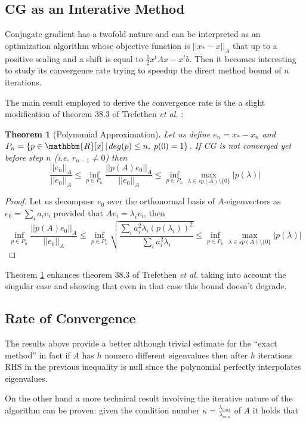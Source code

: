 \documentclass[12pt]{article}
\newcommand{\R}{\mathbbm{R}}
\newcommand{\1}{\mathbbm{1}}
\newtheorem{theorem}{Theorem}
\begin{document}
\subsection{CG as an Interative Method}
Conjugate gradient has a twofold nature and can be interpreted as an optimization algorithm whose objective function is $ || x_* - x ||_A $ that up to a positive scaling and a shift is equal to $ \frac{1}{2}x^t A x - x^t b$. Then it becomes interesting to study its convergence rate trying to speedup the direct method bound of $n$ iterations.

The main result employed to derive the convergence rate is the a slight modification of theorem 38.3 of Trefethen {\em et al.} \cite{trefethen97}:

\begin{theorem}[Polynomial Approximation]\label{polap}
  Let us define $e_n = x_* - x_n$ and $P_n = \left\{p \in \R[x]\, |\, deg(p) \leq n, \; p(0) = 1 \right\}$. If CG is not converged yet before step $n$ (i.e. $r_{n-1} \neq 0$) then 
$$ \frac{||e_n||_A}{||e_0||_A} \leq \inf_{p \in P_n}\frac{||p(A) e_0||_A}{||e_0||_A} \leq \inf_{p \in P_n} \max_{\lambda \in sp(A)\setminus\{0\}}|p(\lambda)|
$$
\end{theorem}
\begin{proof}
  Let us decompose $e_0$ over the orthonormal basis of $A$-eigenvectors as\\ $e_0 = \sum_i a_i v_i$ provided that $A v_i = \lambda_i v_i$, then
$$\inf_{p \in P_n}\frac{||p(A) e_0||_A}{||e_0||_A} \leq \inf_{p \in P_n}\sqrt{\frac{\sum_i a_i^2 \lambda_i \left(p(\lambda_i)\right)^2}{\sum_i a_i^2 \lambda_i}}\leq \inf_{p \in P_n} \max_{\lambda \in sp(A)\setminus\{0\}}|p(\lambda)|$$

\end{proof}

 Theorem \ref{polap} enhances theorem 38.3 of Trefethen {\em et al.} \cite{trefethen97} taking into account the singular case and showing that even in that case this bound doesn't degrade.

\subsection{Rate of Convergence}
The results above provide a better although trivial estimate for the ``exact method'' in fact if $A$ has $h$ nonzero different eigenvalues then after $h$ iterations RHS in the previous inequality is null since the polynomial perfectly interpolates eigenvalues.

On the other hand a more technical result involving the iterative nature of the algorithm can be proven: given the condition number $\kappa = \frac{\lambda_{max}}{\lambda_{min}}$ of $A$ it holds that
\end{document}
